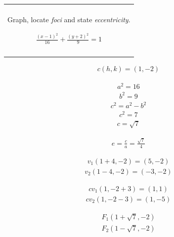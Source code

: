 \documentclass{article}
\newenvironment{question}
  {\begin{center}
  \begin{tabular}{|p{0.9\textwidth}|}
  \hline\\
  }
  {
  \\\\\hline
  \end{tabular}
  \end{center}
  }
\begin{document}
\begin{question}

  Graph, locate \textit{foci} and state \textit{eccentricity}.

  \begin{align*}
    \frac{(x - 1)^2}{16} + \frac{(y + 2)^2}{9} = 1
  \end{align*}
\end{question}
\begin{multicols}{2}
  \begin{align*}
    c(h, k) = (1,-2)
  \end{align*}

  \begin{align*}
    a^2 = 16
  \end{align*}
  \begin{align*}
    b^2 = 9
  \end{align*}
  \begin{align*}
    c^2 = a^2 - b^2
  \end{align*}
  \begin{align*}
    c^2 = 7
  \end{align*}
  \begin{align*}
    c = \sqrt{7}
  \end{align*}

  \begin{align*}
    e = \frac{c}{a} = \frac{\sqrt{7}}{4}
  \end{align*}

  \begin{align*}
    v_1(1 + 4, -2) = (5, -2)
  \end{align*}
  \begin{align*}
    v_2(1 - 4, -2) = (-3, -2)
  \end{align*}

  \begin{align*}
    cv_1(1, -2 + 3) = (1, 1)
  \end{align*}
  \begin{align*}
    cv_2(1, -2 - 3) = (1, -5)
  \end{align*}

  \begin{align*}
    F_1(1 + \sqrt{7}, -2)
  \end{align*}
  \begin{align*}
    F_2(1 - \sqrt{7}, -2)
  \end{align*}
\end{multicols}
\end{document}
